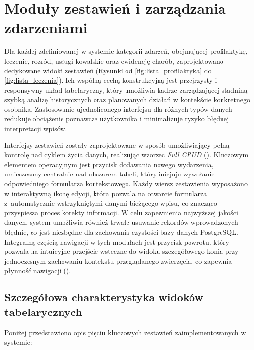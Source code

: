 \section{Moduły zestawień i zarządzania zdarzeniami}

Dla każdej zdefiniowanej w systemie kategorii zdarzeń, obejmującej profilaktykę, leczenie, rozród, usługi kowalskie oraz ewidencję chorób, zaprojektowano dedykowane widoki zestawień (Rysunki od \ref{fig:lista_profilaktyka} do \ref{fig:lista_leczenia}). Ich wspólną cechą konstrukcyjną jest przejrzysty i responsywny układ tabelaryczny, który umożliwia kadrze zarządzającej stadniną szybką analizę historycznych oraz planowanych działań w kontekście konkretnego osobnika. Zastosowanie ujednoliconego interfejsu dla różnych typów danych redukuje obciążenie poznawcze użytkownika i minimalizuje ryzyko błędnej interpretacji wpisów.

Interfejsy zestawień zostały zaprojektowane w sposób umożliwiający pełną kontrolę nad cyklem życia danych, realizując wzorzec \textit{Full CRUD} (). Kluczowym elementem operacyjnym jest przycisk dodawania nowego wydarzenia, umieszczony centralnie nad obszarem tabeli, który inicjuje wywołanie odpowiedniego formularza kontekstowego. Każdy wiersz zestawienia wyposażono w interaktywną ikonę edycji, która pozwala na otwarcie formularza z~automatycznie wstrzykniętymi danymi bieżącego wpisu, co znacząco przyspiesza proces korekty informacji.
W celu zapewnienia najwyższej jakości danych, system umożliwia również trwałe usuwanie rekordów wprowadzonych błędnie, co jest niezbędne dla zachowania czystości bazy danych PostgreSQL. Integralną częścią nawigacji w tych modułach jest przycisk powrotu, który pozwala na intuicyjne przejście wsteczne do widoku szczegółowego konia przy jednoczesnym zachowaniu kontekstu przeglądanego zwierzęcia, co zapewnia płynność nawigacji ().

\subsection{Szczegółowa charakterystyka widoków tabelarycznych}
Poniżej przedstawiono opis pięciu kluczowych zestawień zaimplementowanych w systemie:

